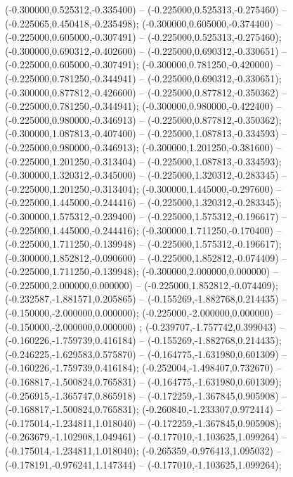  (-0.300000,0.525312,-0.335400) -- (-0.225000,0.525313,-0.275460) -- (-0.225065,0.450418,-0.235498);
 (-0.300000,0.605000,-0.374400) -- (-0.225000,0.605000,-0.307491) -- (-0.225000,0.525313,-0.275460);
 (-0.300000,0.690312,-0.402600) -- (-0.225000,0.690312,-0.330651) -- (-0.225000,0.605000,-0.307491);
 (-0.300000,0.781250,-0.420000) -- (-0.225000,0.781250,-0.344941) -- (-0.225000,0.690312,-0.330651);
 (-0.300000,0.877812,-0.426600) -- (-0.225000,0.877812,-0.350362) -- (-0.225000,0.781250,-0.344941);
 (-0.300000,0.980000,-0.422400) -- (-0.225000,0.980000,-0.346913) -- (-0.225000,0.877812,-0.350362);
 (-0.300000,1.087813,-0.407400) -- (-0.225000,1.087813,-0.334593) -- (-0.225000,0.980000,-0.346913);
 (-0.300000,1.201250,-0.381600) -- (-0.225000,1.201250,-0.313404) -- (-0.225000,1.087813,-0.334593);
 (-0.300000,1.320312,-0.345000) -- (-0.225000,1.320312,-0.283345) -- (-0.225000,1.201250,-0.313404);
 (-0.300000,1.445000,-0.297600) -- (-0.225000,1.445000,-0.244416) -- (-0.225000,1.320312,-0.283345);
 (-0.300000,1.575312,-0.239400) -- (-0.225000,1.575312,-0.196617) -- (-0.225000,1.445000,-0.244416);
 (-0.300000,1.711250,-0.170400) -- (-0.225000,1.711250,-0.139948) -- (-0.225000,1.575312,-0.196617);
 (-0.300000,1.852812,-0.090600) -- (-0.225000,1.852812,-0.074409) -- (-0.225000,1.711250,-0.139948);
 (-0.300000,2.000000,0.000000) -- (-0.225000,2.000000,0.000000) -- (-0.225000,1.852812,-0.074409);
 (-0.232587,-1.881571,0.205865) -- (-0.155269,-1.882768,0.214435) -- (-0.150000,-2.000000,0.000000);
 (-0.225000,-2.000000,0.000000) -- (-0.150000,-2.000000,0.000000) ;
 (-0.239707,-1.757742,0.399043) -- (-0.160226,-1.759739,0.416184) -- (-0.155269,-1.882768,0.214435);
 (-0.246225,-1.629583,0.575870) -- (-0.164775,-1.631980,0.601309) -- (-0.160226,-1.759739,0.416184);
 (-0.252004,-1.498407,0.732670) -- (-0.168817,-1.500824,0.765831) -- (-0.164775,-1.631980,0.601309);
 (-0.256915,-1.365747,0.865918) -- (-0.172259,-1.367845,0.905908) -- (-0.168817,-1.500824,0.765831);
 (-0.260840,-1.233307,0.972414) -- (-0.175014,-1.234811,1.018040) -- (-0.172259,-1.367845,0.905908);
 (-0.263679,-1.102908,1.049461) -- (-0.177010,-1.103625,1.099264) -- (-0.175014,-1.234811,1.018040);
 (-0.265359,-0.976413,1.095032) -- (-0.178191,-0.976241,1.147344) -- (-0.177010,-1.103625,1.099264);
